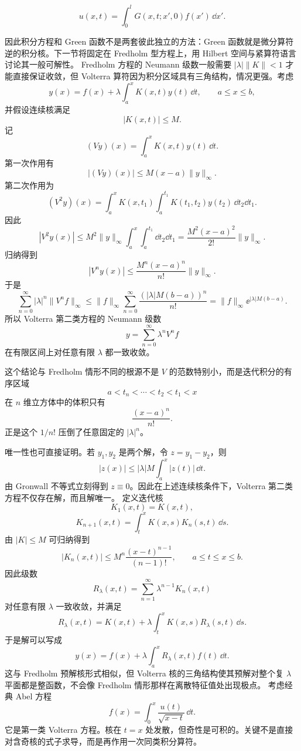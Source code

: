\[
\boxed{
u(x,t)=\int_0^lG(x,t;x',0)f(x')\,\dd x'
}.
\]

因此积分方程和 Green 函数不是两套彼此独立的方法：Green 函数就是微分算符逆的积分核。下一节将固定在 Fredholm 型方程上，用 Hilbert 空间与紧算符语言讨论其一般可解性。
Fredholm 方程的 Neumann 级数一般需要 $|\lambda|\|K\|<1$ 才能直接保证收敛，但 Volterra 算符因为积分区域具有三角结构，情况更强。考虑
\[
y(x)=f(x)+\lambda\int_a^xK(x,t)y(t)\,\dd t,
\qquad a\le x\le b,
\]
并假设连续核满足
\[
|K(x,t)|\le M.
\]
记
\[
(Vy)(x)=\int_a^xK(x,t)y(t)\,\dd t.
\]
第一次作用有
\[
|(Vy)(x)|\le M(x-a)\|y\|_\infty.
\]
第二次作用为
\[
(V^2y)(x)
=\int_a^x\!K(x,t_1)
\int_a^{t_1}\!K(t_1,t_2)y(t_2)\,\dd t_2\dd t_1.
\]
因此
\[
|V^2y(x)|
\le M^2\|y\|_\infty
\int_a^x\int_a^{t_1}\dd t_2\dd t_1
=\frac{M^2(x-a)^2}{2!}\|y\|_\infty.
\]
归纳得到
\begin{equation*}\boxed{
|V^ny(x)|
\le \frac{M^n(x-a)^n}{n!}\|y\|_\infty
}.\end{equation*}
于是
\[
\sum_{n=0}^\infty |\lambda|^n\|V^n f\|_\infty
\le \|f\|_\infty
\sum_{n=0}^\infty
\frac{(|\lambda|M(b-a))^n}{n!}
=\|f\|_\infty \ee^{|\lambda|M(b-a)}.
\]
所以 Volterra 第二类方程的 Neumann 级数
\begin{equation*}\boxed{
y=\sum_{n=0}^\infty \lambda^nV^nf}\end{equation*}
在有限区间上对任意有限 $\lambda$ 都一致收敛。

这个结论与 Fredholm 情形不同的根源不是 $V$ 的范数特别小，而是迭代积分的有序区域
\[
a<t_n<\cdots<t_2<t_1<x
\]
在 $n$ 维立方体中的体积只有
\[
\frac{(x-a)^n}{n!}.
\]
正是这个 $1/n!$ 压倒了任意固定的 $|\lambda|^n$。

唯一性也可直接证明。若 $y_1,y_2$ 是两个解，令 $z=y_1-y_2$，则
\[
|z(x)|\le |\lambda|M\int_a^x|z(t)|\,\dd t.
\]
由 Gronwall 不等式立刻得到 $z\equiv0$。因此在上述连续核条件下，Volterra 第二类方程不仅存在解，而且解唯一。
定义迭代核
\[
K_1(x,t)=K(x,t),
\]
\[
K_{n+1}(x,t)
=\int_t^xK(x,s)K_n(s,t)\,\dd s.
\]
由 $|K|\le M$ 可归纳得到
\[
|K_n(x,t)|
\le M^n\frac{(x-t)^{n-1}}{(n-1)!},
\qquad a\le t\le x\le b.
\]
因此级数
\[
R_\lambda(x,t)
=\sum_{n=1}^{\infty}\lambda^{n-1}K_n(x,t)
\]
对任意有限 $\lambda$ 一致收敛，并满足
\[
R_\lambda(x,t)
=K(x,t)+\lambda\int_t^xK(x,s)R_\lambda(s,t)\,\dd s.
\]
于是解可以写成
\begin{equation*}\boxed{
y(x)=f(x)+\lambda\int_a^xR_\lambda(x,t)f(t)\,\dd t
}.\end{equation*}
这与 Fredholm 预解核形式相似，但 Volterra 核的三角结构使其预解对整个复 $\lambda$ 平面都是整函数，不会像 Fredholm 情形那样在离散特征值处出现极点。
考虑经典 Abel 方程
\begin{equation}
\boxed{
f(x)=\int_0^x\frac{u(t)}{\sqrt{x-t}}\,\dd t
}.
\label{eq:abel-first-kind}
\end{equation}
它是第一类 Volterra 方程。核在 $t=x$ 处发散，但奇性是可积的。关键不是直接对含奇核的式子求导，而是再作用一次同类积分算符。

